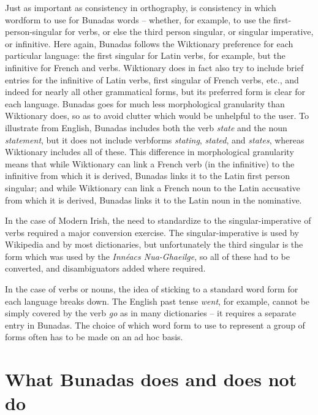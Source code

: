 \documentclass[output=paper,colorlinks,citecolor=brown]{langscibook}
\begin{document}
Just as important as consistency in orthography, is consistency in which word\-form to use for Bunadas words – whether, for example, to use the first-person-singular for verbs, or else the third person singular, or singular imperative, or infinitive. Here again, Bunadas follows the Wiktionary preference for each particular language: the first singular for Latin verbs, for example, but the infinitive for  French and  verbs. Wiktionary does in fact also try to include brief entries for the infinitive of Latin verbs, first singular of  French verbs, etc., and indeed for nearly all other grammatical forms, but its preferred form is clear for each language. Bunadas goes for much less morphological granularity than Wiktionary does, so as to avoid clutter which would be unhelpful to the user. To illustrate from English, Bunadas includes both the verb \textit{state} and the noun \textit{statement}, but it does not include verbforms \textit{stating}, \textit{stated}, and \textit{states}, whereas Wiktionary includes all of these. This difference in morphological granularity means that while Wiktionary can link a French verb (in the infinitive) to the  infinitive from which it is derived, Bunadas links it to the Latin first person singular; and while Wiktionary can link a  French noun to the Latin accusative from which it is derived, Bunadas links it to the Latin noun in the nominative.

In the case of Modern Irish, the need to standardize to the singular-imperative of verbs required a major conversion exercise. The singular-imperative is used by Wikipedia and by most dictionaries, but unfortunately the third singular is the form which was used by the \textit{Innéacs Nua-Ghaeilge}, so all of these had to be converted, and disambiguators added where required.

In the case of  verbs or  nouns, the idea of sticking to a standard word form for each language breaks down. The English past tense \textit{went}, for example, cannot be simply covered by the verb \textit{go} as in many dictionaries – it requires a separate entry in Bunadas. The choice of which word form to use to represent a group of  forms often has to be made on an ad hoc basis.

\section{What Bunadas does and does not do}
\end{document}
